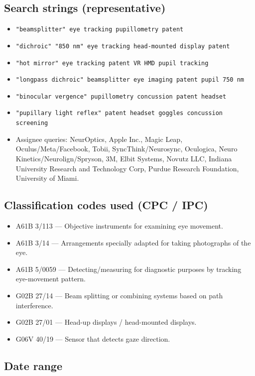 \subsection*{Search strings (representative)}

\begin{itemize}
    \item \texttt{"beamsplitter" eye tracking pupillometry patent}
    \item \texttt{"dichroic" "850 nm" eye tracking head-mounted display patent}
    \item \texttt{"hot mirror" eye tracking patent VR HMD pupil tracking}
    \item \texttt{"longpass dichroic" beamsplitter eye imaging patent pupil 750 nm}
    \item \texttt{"binocular vergence" pupillometry concussion patent headset}
    \item \texttt{"pupillary light reflex" patent headset goggles concussion screening}
    \item Assignee queries: NeurOptics, Apple Inc., Magic Leap, Oculus/Meta/Facebook, Tobii, SyncThink/Neurosync, Oculogica, Neuro Kinetics/Neurolign/Spryson, 3M, Elbit Systems, Novutz LLC, Indiana University Research and Technology Corp, Purdue Research Foundation, University of Miami.
\end{itemize}

\subsection*{Classification codes used (CPC / IPC)}

\begin{itemize}
    \item A61B 3/113 --- Objective instruments for examining eye movement.
    \item A61B 3/14 --- Arrangements specially adapted for taking photographs of the eye.
    \item A61B 5/0059 --- Detecting/measuring for diagnostic purposes by tracking eye-movement pattern.
    \item G02B 27/14 --- Beam splitting or combining systems based on path interference.
    \item G02B 27/01 --- Head-up displays / head-mounted displays.
    \item G06V 40/19 --- Sensor that detects gaze direction.
\end{itemize}

\subsection*{Date range}

